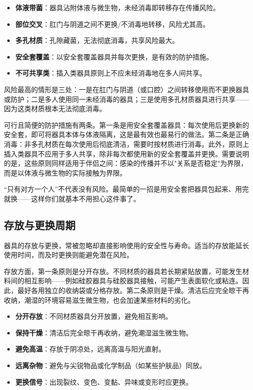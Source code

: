 \documentclass[12pt,UTF8]{ctexbook}
\newcommand{\keyword}[1]{\textbf{#1}}
\begin{document}
\begin{itemize}
	\item \keyword{体液带菌}：器具沾附体液与微生物，未经消毒即转移存在传播风险。
	\item \keyword{部位交叉}：肛门与阴道之间不更换/不消毒地转移，风险尤其高。
	\item \keyword{多孔材质}：孔隙藏菌，无法彻底消毒，共享风险最大。
	\item \keyword{安全套覆盖}：以安全套覆盖器具并每次更换，是有效的防护措施。
	\item \keyword{不可共享类}：插入类器具原则上不应未经消毒地在多人间共享。
\end{itemize}

风险最高的情形是三处：一是在肛门与阴道（或口腔）之间转移使用而不更换器具或防护；二是多人使用同一未经消毒的器具；三是使用多孔材质器具进行共享——因为这类材质根本无法彻底消毒。

可行且简便的防护措施有两条。第一条是用安全套覆盖器具：每次使用后更换新的安全套，即可将器具本体与体液隔离，这是最有效也最易行的做法。第二条是正确消毒：非多孔材质在每次使用后彻底清洁，需要时按材质进行消毒。此外，原则上插入类器具不应用于多人共享，除非每次都使用新的安全套覆盖并更换。需要说明的是，这些原则同样适用于伴侣之间：感染的传播并不以"关系是否稳定"为界限，而是以体液与微生物的实际接触为界限。

\begin{tcolorbox}[colback=pink!5!white,colframe=red!50!black,title=贴心小叮咛]
	“只有对方一个人”不代表没有风险。最简单的一招是用安全套把器具包起来、用完就换——这样你们就基本不用担心这件事了。
\end{tcolorbox}
\subsection{存放与更换周期}

器具的存放与更换，常被忽略却直接影响使用的安全性与寿命。适当的存放能延长使用时间，而及时更换则能避免潜在风险。

存放方面，第一条原则是分开存放。不同材质的器具若长期紧贴放置，可能发生材料间的相互影响——例如硅胶器具与硅胶器具接触，可能产生表面软化或粘连。因此，最好各用独立的收纳袋或分格存放。第二条原则是干燥。清洁后应完全晾干再收纳，潮湿的环境容易滋生微生物，也会加速某些材料的劣化。

\begin{itemize}
	\item \keyword{分开存放}：不同材质器具分开放置，避免相互影响。
	\item \keyword{保持干燥}：清洁后完全晾干再收纳，避免潮湿滋生微生物。
	\item \keyword{避免高温}：存放于阴凉处，远离高温与阳光直射。
	\item \keyword{远离杂物}：避免与尖锐物品或化学制品（如某些护肤品）同放。
	\item \keyword{更换信号}：出现裂纹、变色、变黏、异味或变形时应更换。
\end{itemize}
\end{document}
